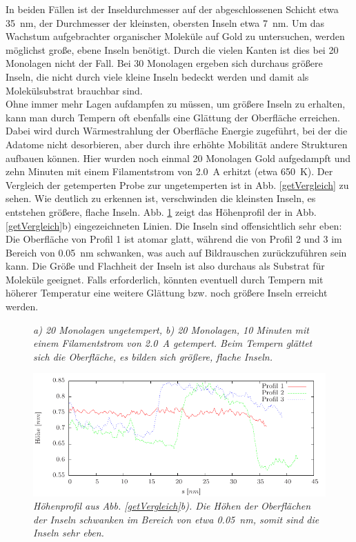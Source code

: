 In beiden Fällen ist der Inseldurchmesser auf der abgeschlossenen Schicht etwa \SI{35}{nm}, der Durchmesser
der kleinsten, obersten Inseln etwa \SI{7}{nm}. Um das Wachstum aufgebrachter organischer Moleküle
auf Gold zu untersuchen, werden möglichst große, ebene Inseln benötigt. Durch die vielen Kanten ist dies bei
20 Monolagen nicht der Fall. Bei 30 Monolagen ergeben sich durchaus größere Inseln, die nicht durch
viele kleine Inseln bedeckt werden und damit als Molekülsubstrat brauchbar sind.\\
Ohne immer mehr Lagen aufdampfen zu müssen, um größere Inseln zu erhalten, kann man durch Tempern
oft ebenfalls eine Glättung der Oberfläche erreichen. Dabei wird durch Wärmestrahlung der Oberfläche
Energie zugeführt, bei der die Adatome nicht desorbieren, aber durch ihre erhöhte Mobilität
andere Strukturen aufbauen können. Hier wurden noch einmal 20 Monolagen Gold aufgedampft und zehn
Minuten mit einem Filamentstrom von \SI{2,0}{A} erhitzt (etwa \SI{650}{K}). Der Vergleich der
getemperten Probe zur ungetemperten ist in Abb. \ref{getVergleich} zu sehen.
Wie deutlich zu erkennen ist, verschwinden die kleinsten Inseln, es entstehen größere, flache
Inseln. Abb. \ref{profil20MLget} zeigt das Höhenprofil der in Abb. \ref{getVergleich}b)
eingezeichneten Linien. Die Inseln sind offensichtlich sehr eben: Die Oberfläche von Profil 1 ist
atomar glatt, während die von Profil 2 und 3 im Bereich von \SI{0,05}{nm} schwanken, was auch auf
Bildrauschen zurückzuführen sein kann. Die Größe und Flachheit der Inseln ist also durchaus als
Substrat für Moleküle geeignet. Falls erforderlich, könnten eventuell durch Tempern mit höherer
Temperatur eine weitere Glättung bzw. noch größere Inseln erreicht werden. 

\begin{figure}[htbp]
	\begin{minipage}[b]{0.5\textwidth} 
		\sffamily
		
	\end{minipage}
	\hfill
	\begin{minipage}[b]{0.5\textwidth}
		\sffamily
		
	\end{minipage}
	\caption{\textit{a) 20 Monolagen ungetempert, b) 20 Monolagen, 10 Minuten mit einem Filamentstrom
	von \SI{2,0}{A} getempert.
	Beim Tempern glättet sich die Oberfläche, es bilden sich größere, flache Inseln.}}
	\label{getVergleich} 
	\centering
		\includegraphics{pics/profiles20MLget}
	\caption{\textit{Höhenprofil aus Abb. \ref{getVergleich}b). Die Höhen der Oberflächen der Inseln
	schwanken im Bereich von etwa \SI{0,05}{nm}, somit sind die Inseln sehr eben.}}
	\label{profil20MLget}
\end{figure}